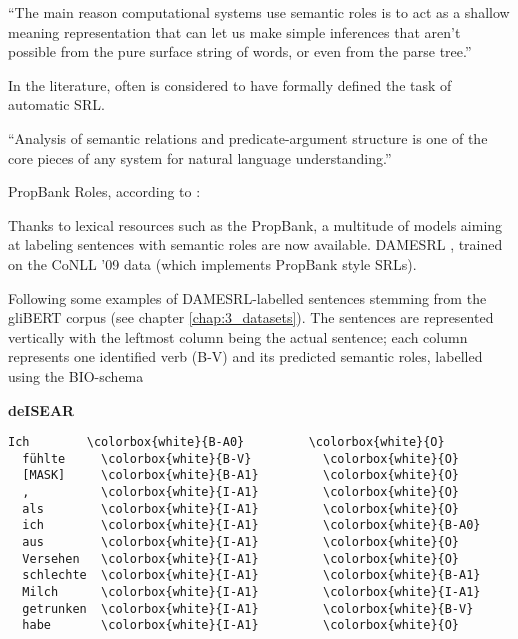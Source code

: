 ``The main reason computational systems use semantic roles is to act as a shallow meaning
representation that can let us make simple inferences that aren’t possible from the pure surface
string of words, or even from the parse tree.'' \cite[p.~375]{jurafsky2019speech}

In the literature, often \cite{gildea2002automatic} is considered to have formally defined the
task of automatic SRL.

``Analysis of semantic relations and predicate-argument structure is one of the core pieces of any
system for natural language understanding.'' \citep{palmer2010semantic}

PropBank Roles, according to \cite{bonial2012english}:

Thanks to lexical resources such as the PropBank, a multitude of models aiming at labeling
sentences with semantic roles are now available. DAMESRL \citep{do2018flexible}, trained on
the CoNLL '09 \citep{hajivc2009conll} data (which implements PropBank style SRLs).

Following some examples of DAMESRL-labelled sentences stemming from the gliBERT corpus (see chapter
\ref{chap:3_datasets}). The sentences are represented vertically with the leftmost column being the
actual sentence; each column represents one identified verb (B-V) and its predicted semantic roles,
labelled using the BIO-schema

\textbf{deISEAR}

\begin{Verbatim}[commandchars=\\\{\}]
  Ich        \colorbox{white}{B-A0}         \colorbox{white}{O}
  fühlte     \colorbox{white}{B-V}          \colorbox{white}{O}
  [MASK]     \colorbox{white}{B-A1}         \colorbox{white}{O}
  ,          \colorbox{white}{I-A1}         \colorbox{white}{O}
  als        \colorbox{white}{I-A1}         \colorbox{white}{O}
  ich        \colorbox{white}{I-A1}         \colorbox{white}{B-A0}
  aus        \colorbox{white}{I-A1}         \colorbox{white}{O}
  Versehen   \colorbox{white}{I-A1}         \colorbox{white}{O}
  schlechte  \colorbox{white}{I-A1}         \colorbox{white}{B-A1}
  Milch      \colorbox{white}{I-A1}         \colorbox{white}{I-A1}
  getrunken  \colorbox{white}{I-A1}         \colorbox{white}{B-V}
  habe       \colorbox{white}{I-A1}         \colorbox{white}{O}
\end{Verbatim}

